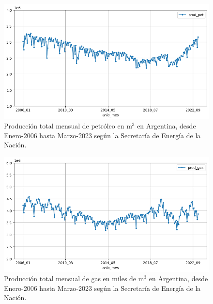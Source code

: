 \documentclass[a4paper]{article}
\begin{document}
\begin{figure}[h]
	\centering
	\includegraphics[trim={0cm 0cm 0cm 0cm},clip,width=\textwidth]{prod_pet.png}
	\caption{Producción total mensual de petróleo en m$^3$ en Argentina, desde Enero-2006 hasta Marzo-2023 según la Secretaría de Energía de la Nación.}
	\label{fig:prodPet}
\end{figure}

\begin{figure}[H]
	\centering
	\includegraphics[trim={0cm 0cm 0cm 0cm},clip,width=\textwidth]{prod_gas.png}
	\caption{Producción total mensual de gas en miles de m$^3$ en Argentina, desde Enero-2006 hasta Marzo-2023 según la Secretaría de Energía de la Nación.}
	\label{fig:prodGas}
\end{figure}
\end{document}
